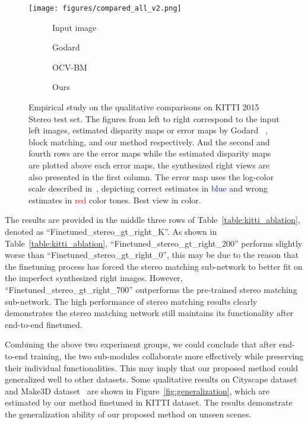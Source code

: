 \documentclass[10pt,twocolumn,letterpaper]{article}
\begin{document}
\begin{figure*}[t!]
\centering
	\texttt{[image: figures/compared\_all\_v2.png]}
    \begin{subfigure}[b]{0.24\linewidth}
    \caption{Input image}
  	\end{subfigure}	
	\begin{subfigure}[b]{0.24\linewidth}
    \caption{Godard \etal~\cite{godard2016unsupervised}}
  	\end{subfigure}
  	\begin{subfigure}[b]{0.24\linewidth}
    \caption{OCV-BM}
  	\end{subfigure}
  	\begin{subfigure}[b]{0.24\linewidth}
    \caption{Ours}
  	\end{subfigure}
  	\vspace{-14pt}
	\caption{Empirical study on the qualitative comparisons on KITTI 2015 Stereo test set. The figures from left to right correspond to the input left images, estimated disparity maps or error maps by Godard \etal ~\cite{godard2016unsupervised}, block matching, and our method respectively. And the second and fourth rows are the error maps while the estimated disparity maps are plotted above each error maps, the synthesized right views are also presented in the first column. The error map uses the log-color scale described in~\cite{Menze2015CVPR}, depicting correct estimates in \textcolor{blue}{blue} and wrong estimates in \textcolor{red}{red} color tones. Best view in color.}
	\label{fig:stereo-comparison}
	\vspace{-12pt}
\end{figure*}

The results are provided in the middle three rows of Table~\ref{table:kitti_ablation}, denoted as ``Finetuned\_stereo\_gt\_right\_K''. As shown in Table~\ref{table:kitti_ablation}, ``Finetuned\_stereo\_gt\_right\_200'' performs slightly worse than ``Finetuned\_stereo\_gt\_right\_0'', this may be due to the reason that the finetuning process has forced the stereo matching sub-network to better fit on the imperfect synthesized right images. However, ``Finetuned\_stereo\_gt\_right\_700'' outperforms the pre-trained stereo matching sub-network. The high performance of stereo matching results clearly demonstrates the stereo matching network still maintains its functionality after end-to-end finetuned. 

Combining the above two experiment groups, we could conclude that after end-to-end training, the two sub-modules collaborate more effectively while preserving their individual functionalities. This may imply that our proposed method could generalized well to other datasets. Some qualitative results on Cityscape dataset~\cite{Cordts2016Cityscapes} and Make3D dataset~\cite{Saxena09make3D} are shown in Figure~\ref{fig:generalization}, which are estimated by our method finetuned in KITTI dataset. The results demonstrate the generalization ability of our proposed method on unseen scenes.
\end{document}
